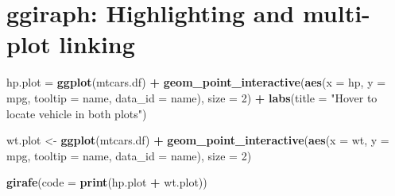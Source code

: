 \documentclass[]{krantz}
\makeatletter
\newenvironment{Shaded}{\begin{snugshade}}{\end{snugshade}}
\newcommand{\DataTypeTok}[1]{\textcolor[rgb]{0.13,0.29,0.53}{#1}}
\newcommand{\DecValTok}[1]{\textcolor[rgb]{0.00,0.00,0.81}{#1}}
\newcommand{\KeywordTok}[1]{\textcolor[rgb]{0.13,0.29,0.53}{\textbf{#1}}}
\newcommand{\NormalTok}[1]{#1}
\newcommand{\OperatorTok}[1]{\textcolor[rgb]{0.81,0.36,0.00}{\textbf{#1}}}
\newcommand{\StringTok}[1]{\textcolor[rgb]{0.31,0.60,0.02}{#1}}
\newenvironment{kframe}{%
\medskip{}
\setlength{\fboxsep}{.8em}
 \def\at@end@of@kframe{}%
 \ifinner\ifhmode%
  \def\at@end@of@kframe{\end{minipage}}%
  \begin{minipage}{\columnwidth}%
 \fi\fi%
 \def\FrameCommand##1{\hskip\@totalleftmargin \hskip-\fboxsep
 \colorbox{shadecolor}{##1}\hskip-\fboxsep
     \hskip-\linewidth \hskip-\@totalleftmargin \hskip\columnwidth}%
 \MakeFramed {\advance\hsize-\width
   \@totalleftmargin\z@ \linewidth\hsize
   \@setminipage}}%
 {\par\unskip\endMakeFramed%
 \at@end@of@kframe}
\renewenvironment{Shaded}{\begin{kframe}}{\end{kframe}}
\makeatother
\begin{document}
\begin{Shaded}
\end{Shaded}

\hypertarget{htmlwidget-ae04e78b255151ac9d79}{}

\hypertarget{ggiraph-highlighting-and-multi-plot-linking}{%
\section{ggiraph: Highlighting and multi-plot linking}\label{ggiraph-highlighting-and-multi-plot-linking}}

\begin{Shaded}
\begin{Highlighting}[]
\NormalTok{hp.plot =}\StringTok{ }\KeywordTok{ggplot}\NormalTok{(mtcars.df) }\OperatorTok{+}
\StringTok{  }\KeywordTok{geom_point_interactive}\NormalTok{(}\KeywordTok{aes}\NormalTok{(}\DataTypeTok{x =}\NormalTok{ hp, }\DataTypeTok{y =}\NormalTok{ mpg,}
    \DataTypeTok{tooltip =}\NormalTok{ name, }\DataTypeTok{data_id =}\NormalTok{ name), }\DataTypeTok{size =} \DecValTok{2}\NormalTok{) }\OperatorTok{+}
\StringTok{  }\KeywordTok{labs}\NormalTok{(}\DataTypeTok{title =} \StringTok{"Hover to locate vehicle in both plots"}\NormalTok{)}

\NormalTok{wt.plot <-}\StringTok{ }\KeywordTok{ggplot}\NormalTok{(mtcars.df) }\OperatorTok{+}
\StringTok{  }\KeywordTok{geom_point_interactive}\NormalTok{(}\KeywordTok{aes}\NormalTok{(}\DataTypeTok{x =}\NormalTok{ wt, }\DataTypeTok{y =}\NormalTok{ mpg,}
    \DataTypeTok{tooltip =}\NormalTok{ name, }\DataTypeTok{data_id =}\NormalTok{ name), }\DataTypeTok{size =} \DecValTok{2}\NormalTok{)}

\KeywordTok{girafe}\NormalTok{(}\DataTypeTok{code =} \KeywordTok{print}\NormalTok{(hp.plot }\OperatorTok{+}\StringTok{ }\NormalTok{wt.plot))}
\end{Highlighting}
\end{Shaded}
\end{document}
